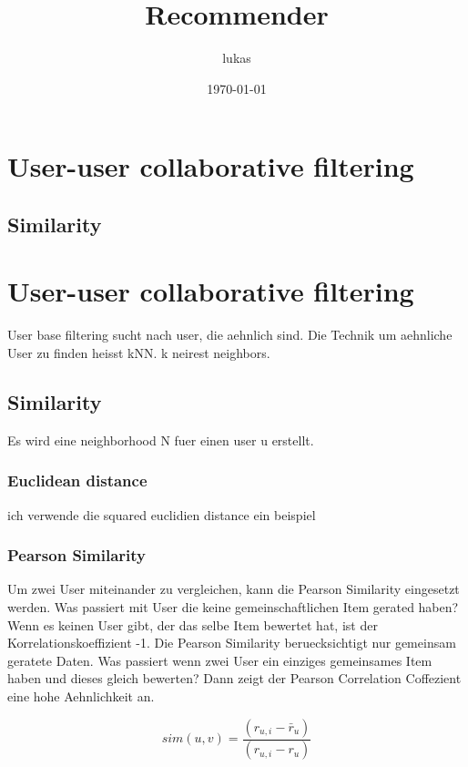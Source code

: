 \documentclass[11pt]{article}
\title{Recommender}
\author{lukas}
\date{\today}
\begin{document}
\maketitle


\section{User-user collaborative filtering}
\label{sec-1}
\subsection{Similarity}
\label{sec-1-1}
\section{User-user collaborative filtering}
\label{sec-2}

User base filtering sucht nach user, die aehnlich sind. 
Die Technik um aehnliche User zu finden heisst kNN. k neirest neighbors.

\subsection{Similarity}
\label{sec-2-1}

Es wird eine neighborhood N fuer einen user u erstellt.
\subsubsection{Euclidean distance}
\label{sec-2-1-1}

ich verwende die squared euclidien distance
ein beispiel

\subsubsection{Pearson Similarity}
\label{sec-2-1-2}

Um zwei User miteinander zu vergleichen, kann die Pearson Similarity eingesetzt werden.
Was passiert mit User die keine gemeinschaftlichen Item gerated haben? 
Wenn es keinen User gibt, der das selbe Item bewertet hat, ist der Korrelationskoeffizient -1.
Die Pearson Similarity beruecksichtigt nur gemeinsam geratete Daten.
Was passiert wenn zwei User ein einziges gemeinsames Item haben und dieses gleich bewerten?
Dann zeigt der Pearson Correlation Coffezient eine hohe Aehnlichkeit an.

\begin{equation}
sim(u, v) = \frac{(r_{u,i} - \bar{r}_u)}{ (r_{u,i} - r_u)}  
\end{equation}
\end{document}
